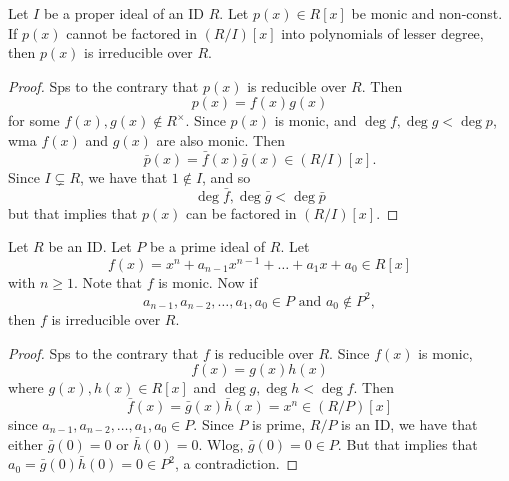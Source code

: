 \documentclass[notoc,notitlepage]{tufte-book}
\begin{document}
\begin{propo}\label{propo:polynomials_that_cannot_be_factored_over_the_ideals_is_irreducible}
  Let $I$ be a proper ideal of an ID $R$. Let $p(x) \in R[x]$ be monic and non-const.
  If $p(x)$ cannot be factored in $\left( R / I \right)[x]$  into polynomials of
  lesser degree, then $p(x)$ is irreducible over $R$.
\end{propo}

\begin{proof}
  Sps to the contrary that $p(x)$ is reducible over $R$. Then
  \begin{equation*}
    p(x) = f(x) g(x)
  \end{equation*}
  for some $f(x), g(x) \notin R^\times$. Since $p(x)$ is monic, and $\deg f, \deg g
  < \deg p$, wma $f(x)$ and $g(x)$ are also monic. Then
  \begin{equation*}
    \bar{p}(x) = \bar{f}(x) \bar{g}(x) \in \left( R/I \right)[x].
  \end{equation*}
  Since $I \subsetneq R$, we have that $1 \notin I$, and so
  \begin{equation*}
    \deg \bar{f}, \deg \bar{g} < \deg \bar{p}
  \end{equation*}
  but that implies that $p(x)$ can be factored in $\left( R/I \right)[x]$.
\end{proof}

\begin{propo}\label{propo:eisenstein_s_criterion}
  Let $R$ be an ID. Let $P$ be a prime ideal of $R$. Let
  \begin{equation*}
    f(x) = x^n + a_{n - 1} x^{n - 1} + \hdots + a_1 x + a_0 \in R[x]
  \end{equation*}
  with $n \geq 1$. Note that $f$ is monic. Now if
  \begin{equation*}
    a_{n - 1}, a_{n - 2}, \ldots, a_1, a_0 \in P \text{ and } a_0 \notin P^2,
  \end{equation*}
  then $f$ is irreducible over $R$.
\end{propo}

\begin{proof}
  Sps to the contrary that $f$ is reducible over $R$. Since $f(x)$ is monic,
  \begin{equation*}
    f(x) = g(x) h(x)
  \end{equation*}
  where $g(x), h(x) \in R[x]$ and $\deg g, \deg h < \deg f$. Then
  \begin{equation*}
    \bar{f}(x) = \bar{g}(x) \bar{h}(x) = x^n \in (R/P)[x]
  \end{equation*}
  since $a_{n - 1}, a_{n - 2}, \ldots, a_1, a_0 \in P$.  Since $P$ is prime,
  $R/P$ is an ID, we have that either $\bar{g}(0) = 0$ or $\bar{h}(0) = 0$.
  Wlog, $\bar{g}(0) = 0 \in P$. But that implies that 
  $a_0 = \bar{g}(0)\bar{h}(0) = 0 \in P^2$, a contradiction.
\end{proof}
\end{document}
